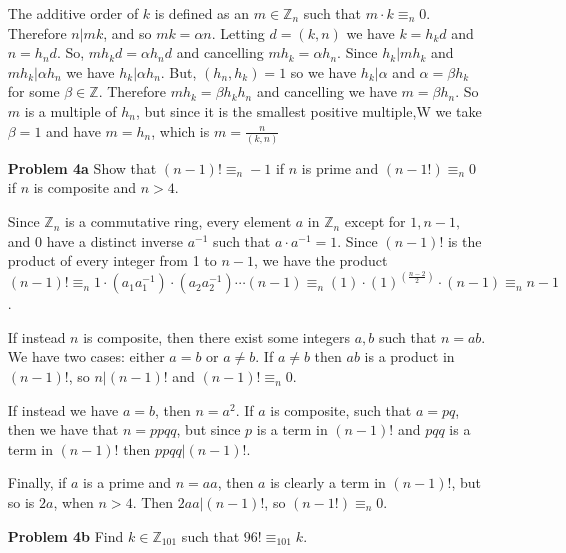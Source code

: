 \documentclass[letterpaper]{article}
\newcommand{\Integers}{\mathbb{Z}}
\begin{document}
\begin{itemize}
          The additive order of \(k\) is defined as an \(m \in \Integers_n\) such that \(m\cdot k \equiv_n 0\).
          Therefore \(n | mk\), and so \(mk = \alpha n\).
          Letting \(d = (k, n)\) we have \(k = h_kd\) and \(n = h_nd\).
          So, \(mh_kd = \alpha h_nd\) and cancelling \(mh_k = \alpha h_n\).
          Since \(h_k | mh_k\) and \(mh_k | \alpha h_n\) we have \(h_k| \alpha h_n\).
          But, \((h_n, h_k) = 1\) so we have \(h_k | \alpha\)
          and \(\alpha = \beta h_k\) for some \(\beta \in \Integers\).
          Therefore \(mh_k = \beta h_k h_n\) and cancelling we have \(m = \beta h_n\).
          So \(m\) is a multiple of \(h_n\), but since it is the smallest positive multiple,W we take \(\beta = 1\) and have \(m = h_n\), which is \(m = \frac{n}{(k,n)}\)
    \item[\textbf{Problem 4a}] Show that \((n-1)! \equiv_n -1\) if \(n\) is prime and \((n-1!) \equiv_n 0\) if \(n\) is composite and \(n > 4\).

          Since \(\Integers_n\) is a commutative ring, every element \(a\) in \(\Integers_n\) except for \(1, n-1,\) and \(0\) have a distinct inverse \(a^{-1}\) such that \(a \cdot a^{-1} = 1\). Since \((n-1)!\) is the product of every integer from 1 to \(n-1\), we have the product \((n-1)! \equiv_n 1\cdot (a_1a_1^{-1})\cdot (a_2a_2^{-1})\cdots (n-1) \equiv_n (1)\cdot{(1)}^{(\frac{n-2}{2})}\cdot(n-1) \equiv_n n-1\).

          If instead \(n\) is composite, then there exist some integers \(a, b\) such that \(n = ab\). We have two cases: either \(a = b\) or \(a \neq b\).
          If \(a \neq b\) then \(ab\) is a product in \((n-1)!\), so \(n | (n-1)!\) and \((n-1)! \equiv_n 0\).

          If instead we have \(a = b\), then \(n = a^2\). If \(a\) is composite, such that \(a = pq\), then we have that \(n = ppqq\), but since \(p\) is a term in \((n-1)!\) and \(pqq\) is a term in \((n-1)!\) then \(ppqq | (n-1)!\).

          Finally, if \(a\) is a prime and \(n = aa\), then \(a\) is clearly a term in \((n-1)!\), but so is \(2a\), when \(n > 4\). Then \(2aa | (n-1)!\), so \((n-1!) \equiv_n 0\).

    \item[\textbf{Problem 4b}]Find \(k \in \Integers_{101}\) such that \(96!\equiv_{101} k\).


\end{itemize}
\end{document}
